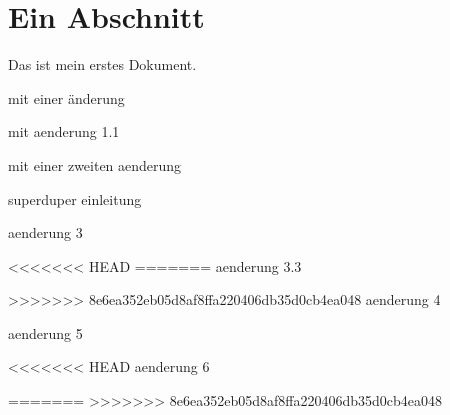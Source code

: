 \documentclass{scrartcl}
\begin{document}
\section{Ein Abschnitt}
Das ist mein erstes Dokument.

mit einer änderung

mit aenderung 1.1

mit einer zweiten aenderung

superduper einleitung

aenderung 3

<<<<<<< HEAD
=======
aenderung 3.3

>>>>>>> 8e6ea352eb05d8af8ffa220406db35d0cb4ea048
aenderung 4

aenderung 5

<<<<<<< HEAD
aenderung 6

=======
>>>>>>> 8e6ea352eb05d8af8ffa220406db35d0cb4ea048
\end{document}
